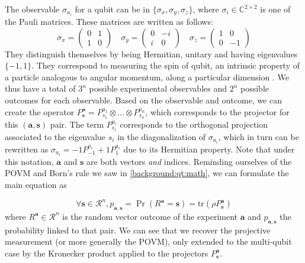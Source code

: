 \documentclass[12pt]{memoir}
\newcommand{\tr}{\text{tr}}
\newcommand{\mb}{\mathbf}
\newcommand{\ti}{\textit}
\begin{document}
The observable $\sigma_{a_i}$ for a qubit can be in $\{\sigma_x, \sigma_y, \sigma_z\}$, where $\sigma_i \in \mathbb{C}^{2 \times 2}$ is one of the Pauli matrices. These matrices are written as follows:
\begin{equation}
    \sigma_x  = \begin{pmatrix}
        0 & 1\\
        1 & 0
    \end{pmatrix}\quad
    \sigma_y = \begin{pmatrix}
        0 & -i\\
        i & 0
    \end{pmatrix}\quad
    \sigma_z = \begin{pmatrix}
        1 & 0\\
        0 & -1
    \end{pmatrix}
\end{equation}
They distinguish themselves by being Hermitian, unitary and having eigenvalues $\{-1, 1\}$. They correspond to measuring the spin of qubit, an intrinsic property of a particle analogous to angular momentum, along a particular dimension \cite{wiki:pauli-matrices}.
We thus have a total of $3^n$ possible experimental observables and $2^n$ possible outcomes for each observable. Based on the observable and outcome, we can create the operator $P^\mb a_{\mb s} = P^{a_1}_{s_1} \otimes \dots \otimes P^{a_n}_{s_n}$, which corresponds to the projector for this $(\mb a,\mb s)$ pair. The term $P^{a_i}_{s_i}$ corresponds to the orthogonal projection associated to the eigenvalue $s_i$ in the diagonalization of $\sigma_{a_i}$, which in turn can be rewritten as $\sigma_{a_i} = -1P^{a_i}_{-1} + 1P^{a_i}_1$ due to its Hermitian property. Note that under this notation, $\mb a$ and $\mb s$ are both vectors \ti{and} indices. Reminding ourselves of the POVM and Born's rule we saw in \ref{background:qt:math}, we can formulate the main equation as


\begin{equation}
    \forall \mb s \in \mathcal{R}^n, p_{\mb a,\mb s} = \Pr(R^{\mb a} = \mb s) = \tr(\rho P^{\mb a}_{\mb s})
\end{equation}
where $R^\mb{a} \in \mathcal{R}^n$ is the random vector outcome of the experiment $\mb a$ and $p_{\mb a,\mb s}$ the probability linked to that pair. We can see that we recover the projective measurement (or more generally the POVM), only extended to the multi-qubit case by the Kronecker product applied to the projectors $P^{\mb a}_\mb{ s}$.\medbreak
\end{document}
